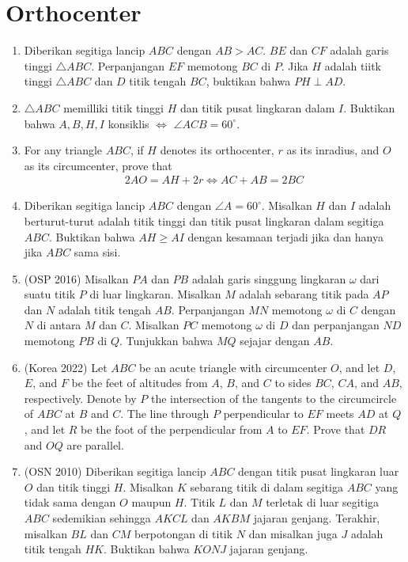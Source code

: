 \documentclass[12pt]{scrartcl}
\begin{document}
\section{Orthocenter}
\begin{enumerate}
\item Diberikan segitiga lancip $ABC$ dengan $AB>AC$. $BE$ dan $CF$ adalah garis tinggi $\triangle ABC$. Perpanjangan $EF$ memotong $BC$ di $P$. Jika $H$ adalah tiitk tinggi $\triangle ABC$ dan $D$ titik tengah $BC$, buktikan bahwa $PH \perp 
 AD$.
 
 \item $\triangle ABC$ memilliki titik tinggi $H$ dan titik pusat lingkaran dalam $I$. Buktikan bahwa $A,B,H,I$ konsiklis $\iff$ $\angle ACB = 60^\circ$.

 \item For any triangle $ABC$, if $H$ denotes its orthocenter, $r$ as its inradius, and $O$ as its circumcenter, prove that 
 \begin{align*}
     2AO = AH + 2r \iff AC+AB=2BC
 \end{align*}

 \item Diberikan segitiga lancip $ABC$ dengan $\angle A = 60^\circ$. Misalkan $H$ dan $I$ adalah berturut-turut adalah titik tinggi dan titik pusat lingkaran dalam segitiga $ABC$. Buktikan bahwa $AH \ge AI$ dengan kesamaan terjadi jika dan hanya jika $ABC$ sama sisi.

 \item (OSP 2016) Misalkan $PA$ dan $PB$ adalah garis singgung lingkaran $\omega$ dari suatu titik $P$ di luar lingkaran. Misalkan $M$ adalah sebarang titik pada $AP$ dan $N$ adalah titik tengah $AB$. Perpanjangan $MN$ memotong $\omega$ di $C$ dengan $N$ di antara $M$ dan $C$. Misalkan $PC$ memotong $\omega$ di $D$ dan perpanjangan $ND$ memotong $PB$ di $Q$. Tunjukkan bahwa $MQ$ sejajar dengan $AB$.

\item (Korea 2022) Let $ABC$ be an acute triangle with circumcenter $O$, and let $D$, $E$, and $F$ be the feet of altitudes from $A$, $B$, and $C$ to sides $BC$, $CA$, and $AB$, respectively. Denote by $P$ the intersection of the tangents to the circumcircle of $ABC$ at $B$ and $C$. The line through $P$ perpendicular to $EF$ meets $AD$ at $Q$, and let $R$ be the foot of the perpendicular from $A$ to $EF$. Prove that $DR$ and $OQ$ are parallel.

\item (OSN 2010) Diberikan segitiga lancip $ABC$ dengan titik pusat lingkaran luar $O$ dan titik tinggi $H$. Misalkan $K$ sebarang titik di dalam segitiga $ABC$ yang tidak sama dengan $O$ maupun $H$. Titik $L$ dan $M$ terletak di luar segitiga $ABC$ sedemikian sehingga $AKCL$ dan $AKBM$ jajaran genjang. Terakhir, misalkan $BL$ dan $CM$ berpotongan di titik $N$ dan misalkan juga $J$ adalah titik tengah $HK$. Buktikan bahwa $KONJ$ jajaran genjang.
 \end{enumerate}
 
\end{document}
